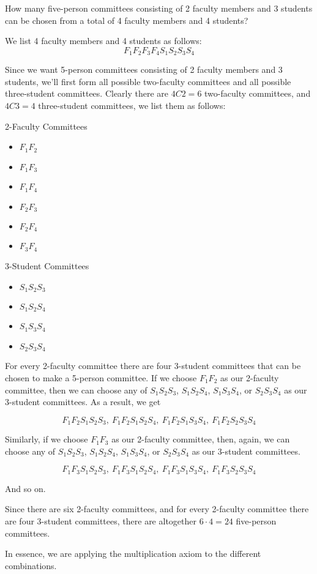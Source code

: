 \begin{example}
    How many five-person committees consisting of 2 faculty members and 3 students can be chosen from a total of 4 faculty members and 4 students?
\end{example}
\begin{solution}
    We list 4 faculty members and 4 students as follows:
    \[ F_1F_2F_3F_4S_1S_2S_3S_4 \]

    Since we want 5-person committees consisting of 2 faculty members and 3 students, we'll first form all possible two-faculty committees and all possible three-student committees. Clearly there are \( 4C2 = 6 \) two-faculty committees, and \( 4C3 = 4 \) three-student committees, we list them as follows:

    2-Faculty Committees
    \begin{itemize}
        \item \( F_1F_2 \)
        \item \( F_1F_3 \)
        \item \( F_1F_4 \)
        \item \( F_2F_3 \)
        \item \( F_2F_4 \)
        \item \( F_3F_4 \)
    \end{itemize}

    3-Student Committees
    \begin{itemize}
        \item \( S_1S_2S_3 \)
        \item \( S_1S_2S_4 \)
        \item \( S_1S_3S_4 \)
        \item \( S_2S_3S_4 \)
    \end{itemize}

    For every 2-faculty committee there are four 3-student committees that can be chosen to make a 5-person committee. If we choose \( F_1F_2 \) as our 2-faculty committee, then we can choose any of \( S_1S_2S_3 \), \( S_1S_2S_4 \), \( S_1S_3S_4 \), or \( S_2S_3S_4 \) as our 3-student committees. As a result, we get

    \[ \boxed{F_1F_2}S_1S_2S_3,~ \boxed{F_1F_2}S_1S_2S_4,~  \boxed{F_1F_2}S_1S_3S_4 ,~  \boxed{F_1F_2}S_2S_3S_4 \]

    Similarly, if we choose \( F_1F_3 \) as our 2-faculty committee, then, again, we can choose any of \( S_1S_2S_3 \), \( S_1S_2S_4 \), \( S_1S_3S_4 \), or \( S_2S_3S_4 \) as our 3-student committees.

    \[ \boxed{F_1F_3}S_1S_2S_3,~ \boxed{F_1F_3}S_1S_2S_4,~  \boxed{F_1F_3}S_1S_3S_4 ,~  \boxed{F_1F_3}S_2S_3S_4 \]

    And so on.

    Since there are six 2-faculty committees, and for every 2-faculty committee there are four 3-student committees, there are altogether \( 6 \cdot 4 = 24 \) five-person committees.

    In essence, we are applying the multiplication axiom to the different combinations.
\end{solution}

